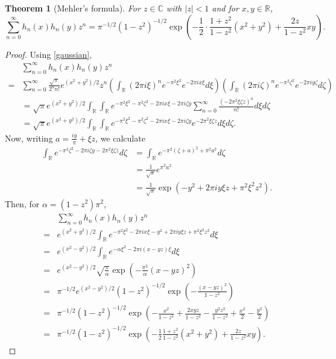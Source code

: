 \documentclass{article}
\newtheorem{theorem}{Theorem}
\theoremstyle{definition}
\begin{document}
\begin{theorem}[Mehler's formula]
For $z \in \mathbb{C}$ with $|z|<1$ and for $x,y \in \mathbb{R}$,
\[
\sum_{n=0}^\infty h_n(x) h_n(y) z^n = \pi^{-1/2} (1-z^2)^{-1/2} \exp\left(-\frac{1}{2} \cdot \frac{1+z^2}{1-z^2}(x^2+y^2) + \frac{2z}{1-z^2} xy\right).
\]
\end{theorem}
\begin{proof}
Using \eqref{gaussian},
\[
\begin{split}
&\sum_{n=0}^\infty h_n(x) h_n(y) z^n\\
=&\sum_{n=0}^\infty 
\frac{\sqrt{\pi}}{2^n n!} e^{(x^2+y^2)/2} z^n \left(\int_{\mathbb{R}} (2\pi i\xi)^n e^{-\pi^2 \xi^2} e^{-2\pi ix\xi} d\xi\right)
\left(\int_{\mathbb{R}} (2\pi i\zeta)^n e^{-\pi^2 \zeta^2} e^{-2\pi iy\zeta} d\zeta\right)\\
&=\sqrt{\pi} e^{(x^2+y^2)/2} \int_{\mathbb{R}} \int_{\mathbb{R}} e^{-\pi^2\xi^2-\pi^2\zeta^2-2\pi ix\xi - 2\pi i\zeta y}
\sum_{n=0}^\infty \frac{(-2\pi^2 \xi \zeta z)^n}{n!} d\xi d\zeta\\
&=\sqrt{\pi} e^{(x^2+y^2)/2}  \int_{\mathbb{R}} \int_{\mathbb{R}}  e^{-\pi^2\xi^2-\pi^2\zeta^2-2\pi ix\xi - 2\pi i\zeta y}
e^{-2\pi^2 \xi \zeta z} d\xi d\zeta.
\end{split}
\]
Now, writing $a=\frac{iy}{\pi}+\xi z$, we calculate
\begin{align*}
\int_{\mathbb{R}} e^{-\pi^2 \zeta^2 - 2\pi i\zeta y-2\pi^2 \xi \zeta z} d\zeta& = \int_{\mathbb{R}}
e^{-\pi^2(\zeta+a)^2+\pi^2 a^2} d\zeta\\
&=\frac{1}{\sqrt{\pi}} e^{\pi^2 a^2}\\
& = \frac{1}{\sqrt{\pi}} \exp\left(-y^2+2\pi iy\xi z +\pi^2 \xi^2 z^2\right).
\end{align*}
Then, for $\alpha=(1-z^2)\pi^2$,
\[
\begin{split}
&\sum_{n=0}^\infty h_n(x) h_n(y) z^n\\
=&e^{(x^2+y^2)/2} \int_{\mathbb{R}} e^{-\pi^2 \xi^2-2\pi ix\xi-y^2+2\pi i y\xi z + \pi^2 \xi^2 z^2} d\xi\\
=&e^{(x^2-y^2)/2} \int_{\mathbb{R}}  e^{-\alpha \xi^2-2\pi i(x-yz) \xi} d\xi\\
=&e^{(x^2-y^2)/2} \sqrt{\frac{\pi}{\alpha}} \exp\left(-\frac{\pi^2}{\alpha} (x-yz)^2\right)\\
=&\pi^{-1/2} e^{(x^2-y^2)/2} (1-z^2)^{-1/2} \exp\left(-\frac{(x-yz)^2}{1-z^2}\right)\\
=&\pi^{-1/2} (1-z^2)^{-1/2} \exp\left(-\frac{x^2}{1-z^2}+\frac{2xyz}{1-z^2}-\frac{y^2z^2}{1-z^2}+\frac{x^2}{2}-\frac{y^2}{2}\right)\\
=&\pi^{-1/2} (1-z^2)^{-1/2} \exp\left(-\frac{1}{2} \frac{1+z^2}{1-z^2}(x^2+y^2) + \frac{2z}{1-z^2} xy\right).
\end{split}
\]
\end{proof}
\end{document}
